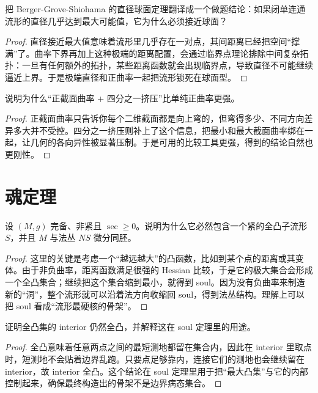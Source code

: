 \documentclass[11pt,a4paper,openany]{ctexbook}
\numberwithin{equation}{chapter}
\begin{document}
\begin{problem}
把 Berger-Grove-Shiohama 的直径球面定理翻译成一个做题结论：如果闭单连通流形的直径几乎达到最大可能值，它为什么必须接近球面？
\end{problem}
\begin{proof}
直径接近最大值意味着流形里几乎存在一对点，其间距离已经把空间“撑满”了。曲率下界再加上这种极端的距离配置，会通过临界点理论排除中间复杂拓扑：一旦有任何额外的拓扑，某些距离函数就会出现临界点，导致直径不可能继续逼近上界。于是极端直径和正曲率一起把流形锁死在球面型。  
\end{proof}

\begin{problem}
说明为什么“正截面曲率 + 四分之一挤压”比单纯正曲率更强。
\end{problem}
\begin{proof}
正截面曲率只告诉你每个二维截面都是向上弯的，但弯得多少、不同方向差异多大并不受控。四分之一挤压则补上了这个信息，把最小和最大截面曲率绑在一起，让几何的各向异性被显著压制。于是可用的比较工具更强，得到的结论自然也更刚性。  
\end{proof}

\section{魂定理}

\begin{problem}
设 \((M,g)\) 完备、非紧且 \(\sec\ge 0\)。说明为什么它必然包含一个紧的全凸子流形 \(S\)，并且 \(M\) 与法丛 \(NS\) 微分同胚。
\end{problem}
\begin{proof}
这里的关键是考虑一个“越远越大”的凸函数，比如到某个点的距离或其变体。由于非负曲率，距离函数满足很强的 Hessian 比较，于是它的极大集合会形成一个全凸集合；继续把这个集合缩到最小，就得到 soul。因为没有负曲率来制造新的“洞”，整个流形就可以沿着法方向收缩回 soul，得到法丛结构。理解上可以把 soul 看成“流形最硬核的骨架”。  
\end{proof}

\begin{problem}
证明全凸集的 interior 仍然全凸，并解释这在 soul 定理里的用途。
\end{problem}
\begin{proof}
全凸意味着任意两点之间的最短测地都留在集合内，因此在 interior 里取点时，短测地不会贴着边界乱跑。只要点足够靠内，连接它们的测地也会继续留在 interior，故 interior 全凸。这个结论在 soul 定理里用于把“最大凸集”与它的内部控制起来，确保最终构造出的骨架不是边界病态集合。  
\end{proof}
\end{document}
